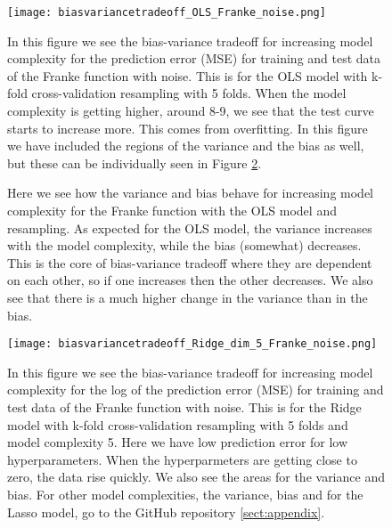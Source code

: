 \documentclass[12pt,a4paper,english]{article}
\begin{document}
\begin{figure}[htbp]
	\centering\texttt{[image: biasvariancetradeoff\_OLS\_Franke\_noise.png]}
	\caption{In this figure we see the bias-variance tradeoff for increasing model complexity for the prediction error (MSE) for training and test data of the Franke function with noise. This is for the OLS model with k-fold cross-validation resampling with 5 folds. When the model complexity is getting higher, around 8-9, we see that the test curve starts to increase more. This comes from overfitting. In this figure we have included the regions of the variance and the bias as well, but these can be individually seen in Figure \ref{fig:var_bias}.\label{fig:biasvar_OLS}}
\end{figure} 

\begin{figure}[htbp]
	\caption{Here we see how the variance and bias behave for increasing model complexity for the Franke function with the OLS model and resampling. As expected for the OLS model, the variance increases with the model complexity, while the bias (somewhat) decreases. This is the core of bias-variance tradeoff where they are dependent on each other, so if one increases then the other decreases. We also see that there is a much higher change in the variance than in the bias.\label{fig:var_bias}}
\end{figure}

\begin{figure}[htbp]
	\centering\texttt{[image: biasvariancetradeoff\_Ridge\_dim\_5\_Franke\_noise.png]}
	\caption{In this figure we see the bias-variance tradeoff for increasing model complexity for the log of the prediction error (MSE) for training and test data of the Franke function with noise. This is for the Ridge model with k-fold cross-validation resampling with 5 folds and model complexity 5. Here we have low prediction error for low hyperparameters. When the hyperparmeters are getting close to zero, the data rise quickly. We also see the areas for the variance and bias. For other model complexities, the variance, bias and for the Lasso model, go to the GitHub repository \ref{sect:appendix}. \label{fig:biasvar_Ridge}}
\end{figure} 
\end{document}
